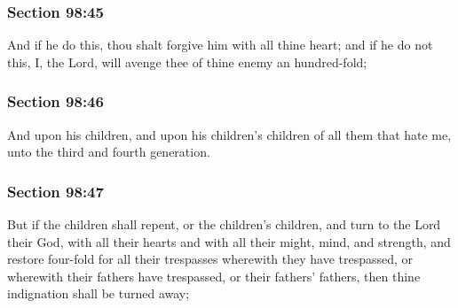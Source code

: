 	\subsubsection{Section 98:45} %
		\label{DC98-45}

		And if he do this, thou shalt forgive him with all thine heart; and if he do not this, I, the Lord, will avenge thee of thine enemy an hundred-fold;


	\subsubsection{Section 98:46} %
		\label{DC98-46}

		And upon his children, and upon his children's children of all them that hate me, unto the third and fourth generation.


	\subsubsection{Section 98:47} %
		\label{DC98-47}

		But if the children shall repent, or the children's children, and turn to the Lord their God, with all their hearts and with all their might, mind, and strength, and restore four-fold for all their trespasses wherewith they have trespassed, or wherewith their fathers have trespassed, or their fathers' fathers, then thine indignation shall be turned away;


